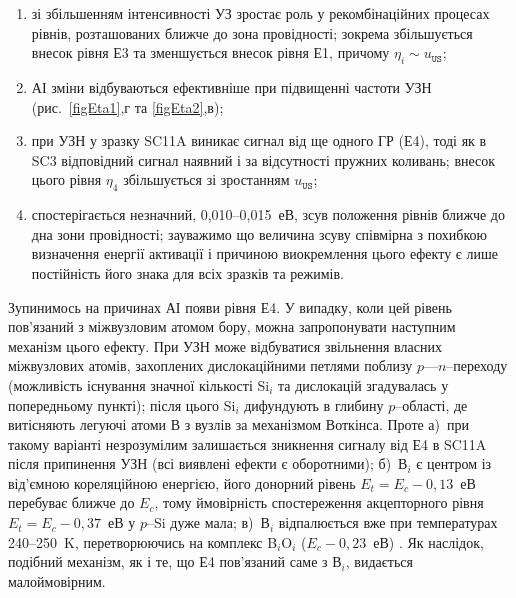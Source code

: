 \begin{enumerate}[label=\asbuk*),leftmargin=0em,itemindent=1.5em]
\item зі збільшенням інтенсивності УЗ зростає роль у рекомбінаційних процесах рівнів, розташованих ближче до зона провідності; зокрема збільшується внесок рівня Е3 та зменшується внесок рівня Е1, причому
$\eta_i\sim u_\mathtt{US}$;
\item АІ зміни відбуваються ефективніше при підвищенні частоти УЗН (рис.~\ref{figEta1},г та \ref{figEta2},в);
\item при УЗН у зразку SC11A виникає сигнал від ще одного ГР (Е4), тоді як в SC3 відповідний сигнал наявний і за відсутності пружних коливань; внесок цього рівня $\eta_4$ збільшується зі зростанням $u_\mathtt{US}$;
\item спостерігається незначний, 0,010--0,015~еВ, зсув положення рівнів ближче до дна зони провідності; зауважимо що величина зсуву співмірна з похибкою визначення енергії активації і причиною виокремлення цього ефекту є лише постійність його знака для всіх зразків та режимів.
\end{enumerate}

Зупинимось на причинах АІ появи рівня Е4.
У випадку, коли цей рівень пов'язаний з міжвузловим атомом бору, можна запропонувати наступним механізм цього ефекту.
При УЗН може відбуватися звільнення власних міжвузлових атомів, захоплених дислокаційними петлями поблизу $p$---$n$--переходу (можливість існування значної кількості Si$_i$ та дислокацій згадувалась у попередньому пункті);
після цього Si$_i$ дифундують в глибину $p$--області, де витісняють легуючі атоми В з вузлів за механізмом Воткінса.
Проте
а)~при такому варіанті незрозумілим залишається зникнення сигналу від Е4 в SC11A після припинення УЗН (всі виявлені ефекти є оборотними);
б)~В$_i$ є центром із від'ємною кореляційною енергією, його донорний рівень $E_t=E_c-0,13$~еВ \cite{Bi:Harris} перебуває ближче до $E_c$, тому ймовірність спостереження акцепторного рівня
$E_t=E_c-0,37$~еВ у $p$--Si дуже мала;
в)~В$_i$ відпалюється вже при температурах 240--250~K, перетворюючись на комплекс B$_i$O$_i$ ($E_c-0,23$~еВ) \cite{PhysRevB94}.
Як наслідок, подібний механізм, як і те, що Е4 пов'язаний саме з В$_i$, видається малоймовірним.

